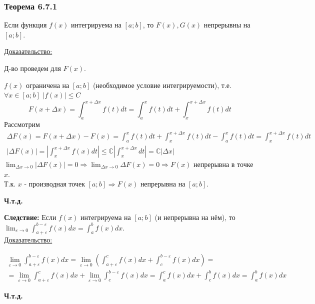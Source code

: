 \documentclass[12pt]{article}
\begin{document}
    \subsubsection*{Теорема 6.7.1}\label{th:6.7.1}
    Если функция $f(x)$ интегрируема на $[a;b]$, то $F(x), G(x)$ непрерывны на $[a;b]$.\par\noindent
    \underline{Доказательство:}
    \begin{adjustwidth}{1.5em}{1.5em}
        Д-во проведем для $F(x)$.\par\noindent
        $f(x)$ ограничена на $[a;b]$ (необходимое условие интегрируемости), т.е. $\forall x \in [a;b]$ $|f(x)|\leq C$
        \[ F(x+\Delta x)=\int_{a}^{x+\Delta x}f(t)dt= \int_{a}^{x} f(t)dt+\int_{x}^{x+\Delta x}f(t)dt \]
        Рассмотрим 
        \begin{gather*}
            \Delta F(x) = F(x + \Delta x) - F(x)=\int_{a}^{x} f(t)dt+\int_{x}^{x+\Delta x}f(t)dt-\int_{a}^{x}f(t)dt=
            \int_{x}^{x+\Delta x}f(t)dt\\
            \left|\Delta F(x)\right| = \left| \int_{x}^{x+\Delta x }f(x)dt\right| \leq \mathbb{C} \left|\int_{x}^{x+\Delta x}dt\right|= \mathbb{C} \left|\Delta x\right|
        \end{gather*}
        $\lim_{\Delta x \to 0}|\Delta F(x)| = 0 \Rightarrow \lim_{\Delta x \to 0}\Delta F(x)=0 \Rightarrow F(x)$ непрерывна в точке $x$.\\
        Т.к. $x$ - производная точек $[a; b] \Rightarrow F(x)$ непрерывна на $[a;b]$.
        \begin{center}
            \textbf{Ч.т.д.}
        \end{center}
        \textbf{Следствие:} Если $f(x)$ интегрируема на $[a;b]$ (и непрерывна на нём), то $\lim_{\varepsilon \to 0} \int_{a+\varepsilon}^{b-\varepsilon}f(x)dx=\int_{a}^{b}f(x)dx$.\\
        \underline{Доказательство:}
        \begin{adjustwidth}{1.5em}{1.5em}
            \begin{gather*}
                \lim_{\varepsilon \to 0} \int_{a+\varepsilon}^{b-\varepsilon}f(x)dx = \lim_{\varepsilon \to 0}\left(\int_{a+\varepsilon}^{c}f(x)dx+\int_{c}^{b-\varepsilon}f(x)dx\right) =\\
                = \lim_{\varepsilon \to 0} \int_{a+\varepsilon}^{c} f(x)dx+\lim_{\varepsilon \to 0}\int_{c}^{b-\varepsilon}f(x)dx = \int_{a}^{c} f(x)dx+\int_{c}^{b} f(x)dx = \int_{a}^{b}f(x)dx
            \end{gather*}
            \begin{center}
                \textbf{Ч.т.д.}
            \end{center}
        \end{adjustwidth}
    \end{adjustwidth}
\end{document}
